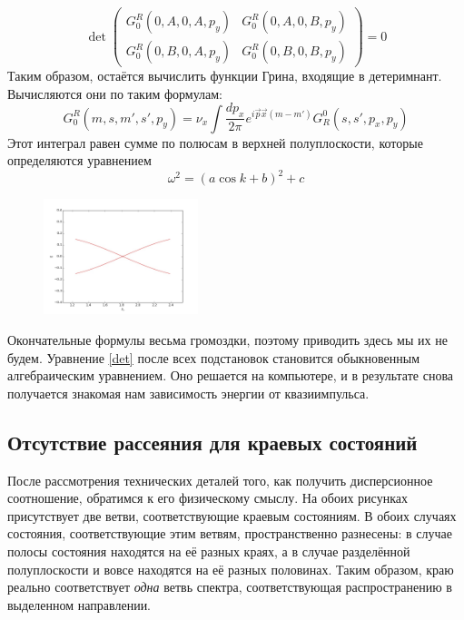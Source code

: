 	\begin{equation}
		\label{det}
		\operatorname{det} 
		\left(\begin{matrix}
			G^R_0(0,A,0,A,p_y) & G^R_0(0,A,0,B,p_y) \\
			G^R_0(0,B,0,A,p_y) & G^R_0(0,B,0,B,p_y) 
		\end{matrix}\right) = 0
	\end{equation}
	Таким образом, остаётся вычислить функции Грина, входящие в детеримнант. Вычисляются они 
	по таким формулам:
	\begin{equation}
		G_0^R(m,s,m',s',p_y) = 
			\nu_x\int \frac{dp_x}{2\pi} e^{i\vec{p}\vec{x}(m-m')} G^0_R(s,s',p_x,p_y)
	\end{equation}
	Этот интеграл равен сумме по полюсам в верхней полуплоскости, 
	которые определяются уравнением
	\begin{equation}
		\omega^2 = (a\cos{k} + b)^2 + c
	\end{equation}

	\begin{figure}[h]
		\includegraphics[width=0.40\textwidth]{edge_kanemele.jpg}
	\end{figure}
	Окончательные формулы весьма громоздки, поэтому приводить здесь мы их не будем. Уравнение
	\eqref{det} после всех подстановок становится обыкновенным алгебраическим уравнением.
	Оно решается на компьютере, и в результате снова получается знакомая нам зависимость 
	энергии от квазиимпульса.

	\subsection{Отсутствие рассеяния для краевых состояний}
	После рассмотрения технических деталей того, как получить дисперсионное соотношение,
	обратимся к его физическому смыслу. На обоих рисунках присутствует две ветви,
	соответствующие краевым состояниям. В обоих случаях состояния, соответствующие этим
	ветвям, пространственно разнесены: в случае полосы состояния находятся на её разных
	краях, а в случае разделённой полуплоскости и вовсе находятся на её разных половинах.
	Таким образом, краю реально соответствует \emph{одна} ветвь спектра, соответствующая
	распространению в выделенном направлении.

